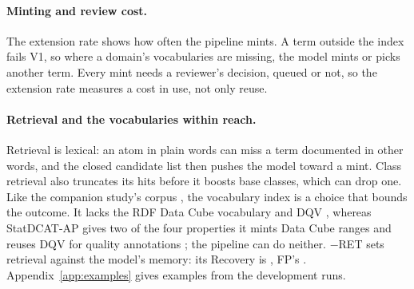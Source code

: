 \paragraph{Minting and review cost.}
The extension rate shows how often the pipeline mints.
A term outside the index fails V1, so where a domain's vocabularies are missing, the model mints or picks another %
term.
Every mint needs a reviewer's decision, queued or not, so the extension rate measures a cost in use, not only reuse.

\paragraph{Retrieval and the vocabularies within reach.}
Retrieval is lexical: an atom in plain words can miss a term documented in other words, and the closed candidate list
then pushes the model toward a mint.
Class retrieval also truncates its hits before it boosts base classes, which can drop one. %
Like the companion study's corpus \cite{anon2027rq1}, the vocabulary index is a choice that bounds the outcome. %
It lacks the RDF Data Cube vocabulary \cite{w3cdatacube} and \ac{DQV} \cite{w3cdqv}, whereas StatDCAT-AP
gives two of the four properties it mints Data Cube ranges and reuses \ac{DQV} for quality annotations %
\cite{statdcatap}; the pipeline can do neither.
$-$RET sets retrieval against the model's memory: its Recovery is , FP's %
.
Appendix~\ref{app:examples} gives examples from the development runs.

